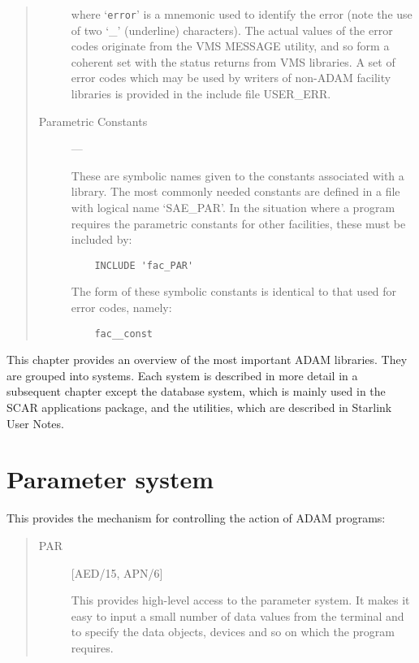 \begin{quote}
\begin{description}
where `{\tt error}' is a mnemonic used to identify the error (note the use of
two `\_' (underline) characters).
The actual values of the error codes originate from the VMS MESSAGE utility,
and so form a coherent set with the status returns from VMS libraries.
A set of error codes which may be used by writers of non-ADAM facility
libraries is provided in the include file USER\_ERR.

\item [Parametric Constants] ---

These are symbolic names given to the constants associated with a library.
The most commonly needed constants are defined in a file with logical name
`SAE\_PAR'.
In the situation where a program requires the parametric constants for
other facilities, these must be included by:

\begin{small}
\begin{verbatim}
    INCLUDE 'fac_PAR'
\end{verbatim}
\end{small}

The form of these symbolic constants is identical to that used for error
codes, namely:

\begin{small}
\begin{verbatim}
    fac__const
\end{verbatim}
\end{small}

\end{description}
\end{quote}

This chapter provides an overview of the most important ADAM libraries.
They are grouped into systems.
Each system is described in more detail in a subsequent chapter except the
database system, which is mainly used in the SCAR applications package, and the
utilities, which are described in Starlink User Notes.

\section{Parameter system}

This provides the mechanism for controlling the action of ADAM programs:
\begin{quote}
\begin{description}

\item [PAR] \hfill [AED/15, APN/6]

 This provides high-level access to the parameter system.
 It makes it easy to input a small number of data values from the terminal and
 to specify the data objects, devices and so on which the program requires.

\end{description}
\end{quote}

